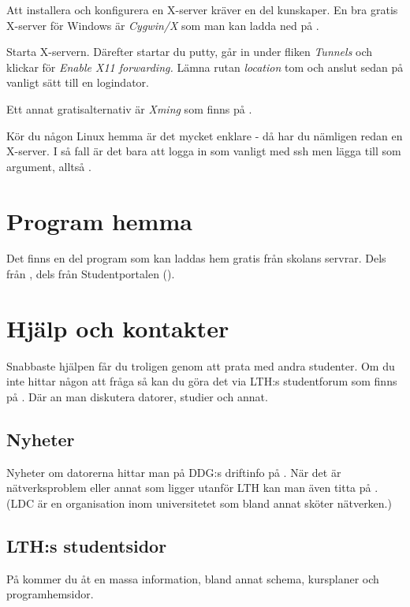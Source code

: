 \documentclass[a4paper,twocolumn]{book}
\begin{document}
Att installera och konfigurera en X-server kräver en del kunskaper. En bra
gratis X-server för Windows är \emph{Cygwin/X} som man kan ladda ned på 
.

Starta X-servern. Därefter startar du putty, går in under fliken
\emph{Tunnels} och klickar för \emph{Enable X11 forwarding.} Lämna rutan
\emph{location} tom och anslut sedan på vanligt sätt till en logindator.

Ett annat gratisalternativ är \emph{Xming} som finns på
.

Kör du någon Linux hemma är det mycket enklare - då har du nämligen redan
en X-server. I så fall är det bara att logga in som vanligt med ssh men lägga
till  som argument, alltså .

\section{Program hemma}

Det finns en del program som kan laddas hem gratis från skolans servrar. Dels
från , dels från Studentportalen 
(). 

\section{Hjälp och kontakter}

Snabbaste hjälpen får du troligen genom att prata med andra studenter. Om du
inte hittar någon att fråga så kan du göra det via LTH:s studentforum som
finns på . Där an man diskutera datorer, studier och
annat.

\subsection{Nyheter}
Nyheter om datorerna hittar man på DDG:s driftinfo på
. När det är nätverksproblem eller annat som ligger
utanför LTH kan man även titta på . (LDC är en
organisation inom universitetet som bland annat sköter nätverken.)

\subsection{LTH:s studentsidor}

På  kommer du åt en massa information, bland
annat schema, kursplaner och programhemsidor.
\end{document}
